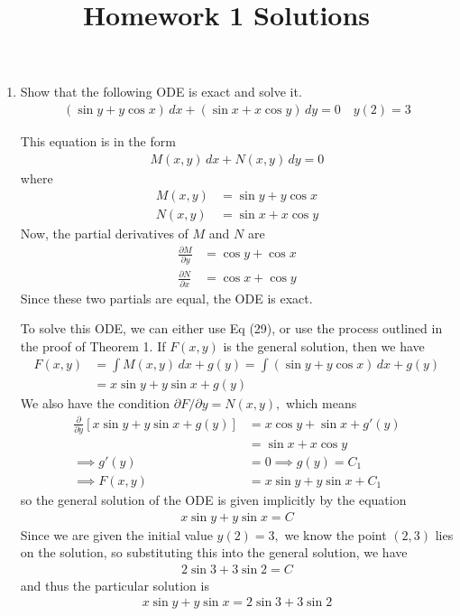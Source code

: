 \documentclass{article}
\begin{document}
\title{Homework 1 Solutions}
\maketitle
\thispagestyle{fancy}

\begin{enumerate}
	\item Show that the following ODE is exact and solve it.
		\begin{align*}
			(\sin y + y\cos x)\, dx + (\sin x + x\cos y)\, dy = 0 \quad y(2)=3
		\end{align*}
		\begin{soln}
			This equation is in the form
			\begin{align*}
				M(x, y)\, dx + N(x, y)\, dy = 0
			\end{align*}
			where
			\begin{align*}
				M(x, y) &= \sin y + y\cos x \\ 
				N(x, y) &= \sin x + x\cos y
			\end{align*}
			Now, the partial derivatives of $M$ and $N$ are
			\begin{align*}
				\frac{\partial M}{\partial y} &= \cos y + \cos x \\
				\frac{\partial N}{\partial x} &= \cos x + \cos y
			\end{align*}
			Since these two partials are equal, the ODE is exact. 

			To solve this ODE, we can either use Eq (29), or use the process outlined in the proof of Theorem 1. If $F(x, y)$ is the general solution, then we have
			\begin{align*}
				F(x, y) &= \int M(x, y)\, dx + g(y) = \int (\sin y + y\cos x)\, dx + g(y) \\
				&= x\sin y + y\sin x + g(y)
			\end{align*}
			We also have the condition $\partial F/\partial y = N(x, y),$ which means
			\begin{align*}
				\frac{\partial}{\partial y} \left[ x\sin y + y\sin x + g(y) \right] &= x\cos y + \sin x + g'(y) \\
				&= \sin x + x\cos y \\ 
				\implies g'(y) &= 0\implies g(y) = C_1 \\
				\implies F(x, y) &= x\sin y + y\sin x + C_1
			\end{align*}
			so the general solution of the ODE is given implicitly by the equation
			\begin{align*}
				x\sin y + y\sin x = C
			\end{align*}
			Since we are given the initial value $y(2)=3,$ we know the point $(2, 3)$ lies on the solution, so substituting this into the general solution, we have
			\begin{align*}
				2\sin 3 + 3\sin 2 = C
			\end{align*}
			and thus the particular solution is 
			\begin{align*}
				\boxed{x\sin y + y\sin x = 2\sin 3 + 3\sin 2}
			\end{align*}
		\end{soln}


\end{enumerate}
\end{document}
